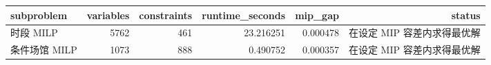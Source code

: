 \begin{tabular}{lrrrrr}
\toprule
subproblem & variables & constraints & runtime\_seconds & mip\_gap & status \\
\midrule
时段 MILP & 5762 & 461 & 23.216251 & 0.000478 & 在设定 MIP 容差内求得最优解 \\
条件场馆 MILP & 1073 & 888 & 0.490752 & 0.000357 & 在设定 MIP 容差内求得最优解 \\
\bottomrule
\end{tabular}
